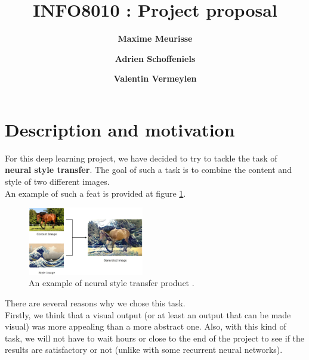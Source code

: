 \documentclass[twocolumn,superscriptaddress,aps]{revtex4-1}
\begin{document}
    \title{\Large{INFO8010 : Project proposal}}
    \vspace{1cm}
    
    \author{\small{\bf Maxime Meurisse}}
    
    \author{\small{\bf Adrien Schoffeniels}}
    
    \author{\small{\bf Valentin Vermeylen}}

    \maketitle
    
    \section{Description and motivation}
    
    For this deep learning project, we have decided to try to tackle the task of \textbf{neural style transfer}. The goal of such a task is to combine the content and style of two different images.\\
    
    An example of such a feat is provided at figure \ref{fig:example}.
    
    \begin{figure}[h]
        \centering
        \includegraphics[width=0.45\textwidth]{resources/png/example.png}
        \caption{An example of neural style transfer product \cite{towards-data-science-img}.}
        \label{fig:example}
    \end{figure}
    
    There are several reasons why we chose this task.\\
    
    Firstly, we think that a visual output (or at least an output that can be made visual) was more appealing than a more abstract one. Also, with this kind of task, we will not have to wait hours or close to the end of the project to see if the results are satisfactory or not (unlike with some recurrent neural networks).\\
    
\end{document}
